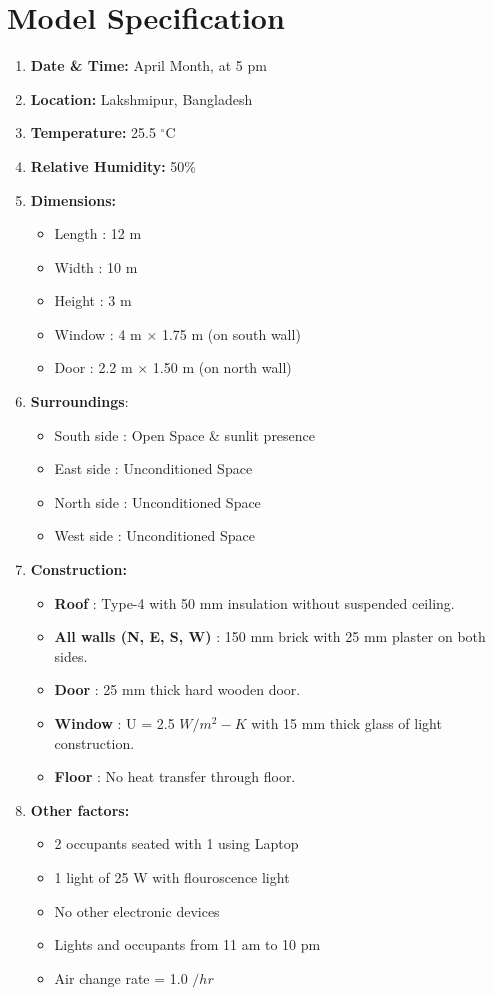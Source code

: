 \documentclass{article}
\begin{document}
\section{Model Specification}
\begin{enumerate}
  \item \textbf{Date \& Time:} April Month, at 5 pm 
  \item \textbf{Location:} Lakshmipur, Bangladesh
  \item \textbf{Temperature:} 25.5 $^{\circ}$C
  \item \textbf{Relative Humidity:} 50\%
  \item \textbf{Dimensions:}
  \begin{itemize}
    \item Length : 12 m
    \item Width : 10 m
    \item Height : 3 m
    \item Window : 4 m $\times$ 1.75 m (on south wall)
    \item Door : 2.2 m $\times$ 1.50 m (on north wall)
  \end{itemize}
  \item \textbf{Surroundings}:
  \begin{itemize}
    \item South side : Open Space \& sunlit presence
    \item East side : Unconditioned Space 
    \item North side : Unconditioned Space 
    \item West side : Unconditioned Space 
  \end{itemize}
  \item \textbf{Construction:}
  \begin{itemize}
    \item \textbf{Roof} : Type-4 with 50 mm insulation without suspended ceiling. 
    \item \textbf{All walls (N, E, S, W)} : 150 mm  brick with 25 mm plaster on both sides.
    \item \textbf{Door} : 25 mm thick hard wooden door.
    \item \textbf{Window} : U = 2.5 $W/m^2-K$ with 15 mm thick glass of light construction.
    \item \textbf{Floor} : No heat transfer through floor. 
  \end{itemize}
  \item \textbf{Other factors:}
  \begin{itemize}
    \item 2 occupants seated with 1 using Laptop 
    \item 1 light of 25 W with flouroscence light 
    \item No other electronic devices 
    \item Lights and occupants from 11 am to 10 pm 
    \item Air change rate = 1.0 $/hr$
  \end{itemize} 
\end{enumerate}
\pagebreak
\end{document}
